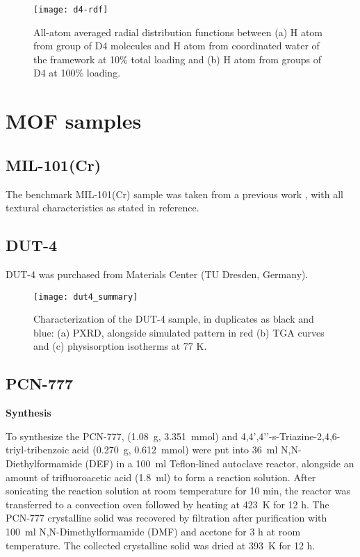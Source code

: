 \begin{figure}[H]
    \centering
    \texttt{[image: d4-rdf]}
    \caption{%
        All-atom averaged radial distribution functions between (a) H atom from
         group of D4 molecules and H atom from coordinated water of the
        framework at 10\% total loading and (b) H atom from  groups of D4 at
        100\% loading.
    }\label{fig:d4-rdf}
\end{figure}

\section{MOF samples}\label{mof-samples}

\subsection{MIL-101(Cr)}

The benchmark MIL-101(Cr) sample was taken from a previous work
\citep{pillaiCapturePerformancesHybrid2017}, with all textural characteristics
as stated in reference.

\subsection{DUT-4}

DUT-4 was purchased from Materials Center (TU Dresden, Germany).

\begin{figure}[H]
    \centering
    \texttt{[image: dut4\_summary]}
    \caption{%
        Characterization of the DUT-4 sample, in duplicates as black
        and blue: (a) PXRD, alongside simulated pattern in red (b) TGA curves
        and (c)  physisorption isotherms at 77 K.
    }\label{fig:dut4-summary}
\end{figure}

\subsection{PCN-777}

\textbf{Synthesis}

To synthesize the PCN-777,  (\SI{1.08}{\gram},
\SI{3.351}{\milli\mol}) and 4,4’,4’’-s-Triazine-2,4,6-triyl-tribenzoic acid
(\SI{0.270}{\gram}, \SI{0.612}{\milli\mol}) were put into \SI{36}{\milli\litre}
N,N-Diethylformamide (DEF) in a \SI{100}{\milli\litre} Teflon-lined autoclave
reactor, alongside an amount of trifluoroacetic acid (\SI{1.8}{\milli\litre}) to
form a reaction solution. After sonicating the reaction solution at room
temperature for 10 min, the reactor was transferred to a convection oven
followed by heating at \SI{423}{\kelvin} for 12 h. The PCN-777 crystalline solid
was recovered by filtration after purification with \SI{100}{\milli\litre}
N,N-Dimethylformamide (DMF) and acetone for 3 h at room temperature. The
collected crystalline solid was dried at \SI{393}{\kelvin} for 12 h.

